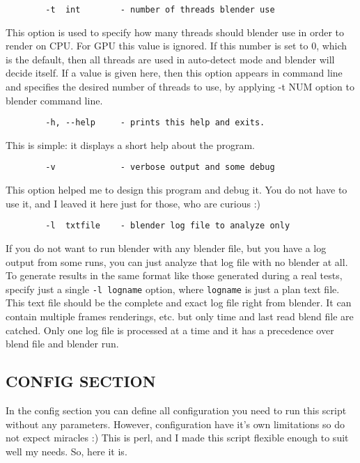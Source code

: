 \documentclass{article}
\begin{document}
\begin{verbatim}
        -t  int        - number of threads blender use
\end{verbatim}


This option is used to specify how many threads should blender use in order to
render on CPU. For GPU this value is ignored. If this number is set to 0, which
is the default, then all threads are used in auto-detect mode and blender will
decide itself. If a value is given here, then this option appears in command
line and specifies the desired number of threads to use, by applying -t NUM
option to blender command line.

\begin{verbatim}
        -h, --help     - prints this help and exits.
\end{verbatim}


This is simple: it displays a short help about the program.

\begin{verbatim}
        -v             - verbose output and some debug
\end{verbatim}


This option helped me to design this program and debug it. You do not have to
use it, and I leaved it here just for those, who are curious :)

\begin{verbatim}
        -l  txtfile    - blender log file to analyze only
\end{verbatim}


If you do not want to run blender with any blender file, but you have a log
output from some runs, you can just analyze that log file with no blender at
all. To generate results in the same format like those generated during a real
tests, specify just a single \texttt{-l logname} option, where \texttt{logname} is just a
plan text file. This text file should be the complete and exact log file right
from blender. It can contain multiple frames renderings, etc. but only time
and last read blend file are catched. Only one log file is processed at a time
and it has a precedence over blend file and blender run.

\subsection*{CONFIG SECTION\label{CONFIG_SECTION}}


In the config section you can define all configuration you need to run this
script without any parameters. However, configuration have it's own limitations
so do not expect miracles :) This is perl, and I made this script flexible
enough to suit well my needs. So, here it is.
\end{document}
